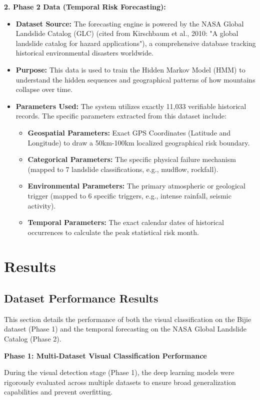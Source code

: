\documentclass[11pt,a4paper]{article}
\begin{document}
\textbf{2. Phase 2 Data (Temporal Risk Forecasting):}
\begin{itemize}
    \item \textbf{Dataset Source:} The forecasting engine is powered by the NASA Global Landslide Catalog (GLC) (cited from Kirschbaum et al., 2010: "A global landslide catalog for hazard applications"), a comprehensive database tracking historical environmental disasters worldwide.
    \item \textbf{Purpose:} This data is used to train the Hidden Markov Model (HMM) to understand the hidden sequences and geographical patterns of how mountains collapse over time.
    \item \textbf{Parameters Used:} The system utilizes exactly 11,033 verifiable historical records. The specific parameters extracted from this dataset include:
    \begin{itemize}
        \item \textbf{Geospatial Parameters:} Exact GPS Coordinates (Latitude and Longitude) to draw a 50km-100km localized geographical risk boundary.
        \item \textbf{Categorical Parameters:} The specific physical failure mechanism (mapped to 7 landslide classifications, e.g., mudflow, rockfall).
        \item \textbf{Environmental Parameters:} The primary atmospheric or geological trigger (mapped to 6 specific triggers, e.g., intense rainfall, seismic activity).
        \item \textbf{Temporal Parameters:} The exact calendar dates of historical occurrences to calculate the peak statistical risk month.
    \end{itemize}
\end{itemize}

\section{Results}

\subsection{Dataset Performance Results}
This section details the performance of both the visual classification on the Bijie dataset (Phase 1) and the temporal forecasting on the NASA Global Landslide Catalog (Phase 2).

\textbf{Phase 1: Multi-Dataset Visual Classification Performance}

During the visual detection stage (Phase 1), the deep learning models were rigorously evaluated across multiple datasets to ensure broad generalization capabilities and prevent overfitting.
\end{document}
